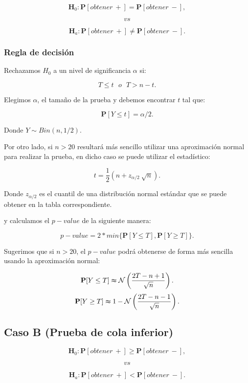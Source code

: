 \documentclass[
  a4paper,
  oneside,
  openany]{book}
\begin{document}
\[\textbf{H}_0: \mathbf{P}[obtener\ +]= \mathbf{P}[obtener\ -],\]

\[vs\]

\[\textbf{H}_a: \mathbf{P}[obtener\ +] \neq \mathbf{P}[obtener\ -].\]

\hypertarget{regla-de-decisiuxf3n-10}{%
\subsubsection*{Regla de decisión}\label{regla-de-decisiuxf3n-10}}


Rechazamos \(H_0\) a un nivel de significancia \(\alpha\) si:

\[T \leq t \ \ \  o \ \ \ T>n-t.\]

Elegimos \(\alpha\), el tamaño de la prueba y debemos encontrar \(t\) tal que:

\[\mathbf{P}[Y \leq t]=\alpha/2.\]

Donde \(Y \sim Bin (n,1/2)\).

Por otro lado, si \(n>20\) resultará más sencillo utilizar una aproximación normal para realizar la prueba, en dicho caso se puede utilizar el estadístico:

\[t=\frac{1}{2}\left(n+z_{\alpha/2}\ \sqrt{n}\right).\]

Donde \(z_{\alpha/2}\) es el cuantil de una distribución normal estándar que se puede obtener en la tabla correspondiente.

y calculamos el \(p-value\) de la siguiente manera:

\[p-value=2*min\{\mathbf{P}[Y\leq T],\mathbf{P}[Y\geq T]\}.\]

Sugerimos que si \(n>20\), el \(p-value\) podrá obtenerse de forma más sencilla usando la aproximación normal:

\[\mathbf{P}[Y\leq T] \thickapprox  \mathcal{N} \left(\frac{2T-n+1}{\sqrt{n}}\right).\]
\[\mathbf{P}[Y\geq T] \thickapprox 1- \mathcal{N} \left(\frac{2T-n-1}{\sqrt{n}}\right).\]

\hypertarget{caso-b-prueba-de-cola-inferior-3}{%
\subsection*{Caso B (Prueba de cola inferior)}\label{caso-b-prueba-de-cola-inferior-3}}


\[\textbf{H}_0: \mathbf{P}[obtener\ +] \geq \mathbf{P}[obtener\ -],\]

\[vs\]

\[\textbf{H}_a: \mathbf{P}[obtener\ +] < \mathbf{P}[obtener\ -].\]
\end{document}
